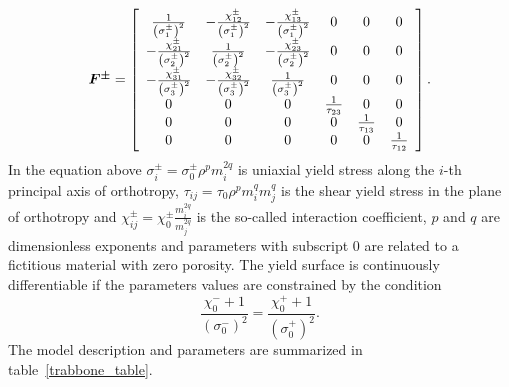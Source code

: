 \documentclass[a4paper]{article}
\newcommand{\mbf}[1]{\mbox{\boldmath$#1$}}
\begin{document}
\begin{equation}
  \mbf{F^{\pm}}=\left[\begin{array}{cccccc}
\frac{1}{\left({\sigma_{1}^{\pm}}\right)^2} & -\frac{\chi_{12}^{\pm}}{\left({\sigma_{1}^{\pm}}\right)^2}&-\frac{\chi_{13}^{\pm}}{\left({\sigma_{1}^{\pm}}\right)^2}& 0& 0&0\\
-\frac{\chi_{21}^{\pm}}{\left({\sigma_{2}^{\pm}}\right)^2} & \frac{1}{\left({\sigma_{2}^{\pm}}\right)^2}&-\frac{\chi_{23}^{\pm}}{\left({\sigma_{2}^{\pm}}\right)^2}& 0& 0&0\\
-\frac{\chi_{31}^{\pm}}{\left({\sigma_{3}^{\pm}}\right)^2} & -\frac{\chi_{32}^{\pm}}{\left({\sigma_{3}^{\pm}}\right)^2}&\frac{1}{\left({\sigma_{3}^{\pm}}\right)^2}& 0& 0&0\\
0 & 0 & 0 & \frac{1}{\tau_{23}} & 0 & 0\\
0 & 0 & 0 & 0 & \frac{1}{\tau_{13}} & 0\\
0 & 0 & 0 & 0 & 0 & \frac{1}{\tau_{12}}
 \end{array}\right].
\end{equation}
In the equation above $\sigma_i^{\pm} = \sigma_0^{\pm}\rho^p m_i^{2q}$ is uniaxial yield stress along the $i$-th principal axis of orthotropy, $\tau_{ij} = \tau_0 \rho^p m_i^q m_j^q$ is the shear yield stress in the plane of orthotropy and $\chi_{ij}^{\pm} = \chi_0^{\pm}\frac{m_i^{2q}}{m_j^{2q}}$ is the so-called interaction coefficient, $p$ and $q$ are dimensionless exponents and parameters with subscript $0$ are related to a fictitious material with zero porosity. The yield surface is continuously differentiable if the parameters values are constrained by the condition
\begin{equation}
\frac{\chi_0^- +1}{(\sigma_0^-)^2} = \frac{\chi_0^+ +1}{(\sigma_0^+)^2}.
\end{equation}
The model description and parameters are summarized in table~\ref{trabbone_table}.
\end{document}
